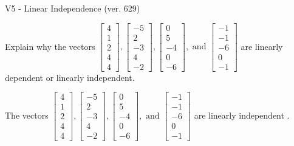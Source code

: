 \begin{exercise}
  \begin{exerciseTitle}V5 - Linear Independence (ver. 629)\end{exerciseTitle}
  \begin{exerciseStatement}
    Explain why the vectors \(\left[\begin{array}{r}
4 \\
1 \\
2 \\
4 \\
4
\end{array}\right] , \left[\begin{array}{r}
-5 \\
2 \\
-3 \\
4 \\
-2
\end{array}\right] , \left[\begin{array}{r}
0 \\
5 \\
-4 \\
0 \\
-6
\end{array}\right] , \text{ and } \left[\begin{array}{r}
-1 \\
-1 \\
-6 \\
0 \\
-1
\end{array}\right]\) are linearly dependent or linearly independent.	


  \end{exerciseStatement}
  \begin{exerciseAnswer}
   The vectors \(\left[\begin{array}{r}
4 \\
1 \\
2 \\
4 \\
4
\end{array}\right] , \left[\begin{array}{r}
-5 \\
2 \\
-3 \\
4 \\
-2
\end{array}\right] , \left[\begin{array}{r}
0 \\
5 \\
-4 \\
0 \\
-6
\end{array}\right] , \text{ and } \left[\begin{array}{r}
-1 \\
-1 \\
-6 \\
0 \\
-1
\end{array}\right]\) are 
  	 linearly independent  .
  


  \end{exerciseAnswer}
\end{exercise}